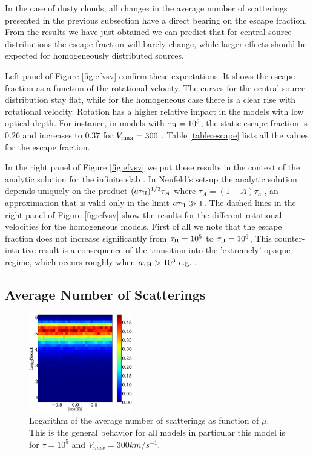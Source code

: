 \documentclass{emulateapj}
\newcommand{\kms}{{\ifmmode{{\mathrm{\,km\ s}^{-1}}}\else{\,km~s$^{-1}$}\fi}}
\begin{document}
In the case of dusty clouds, all changes in the average number
of scatterings presented in the previous subsection have a direct
bearing on the escape fraction. From the results we have just obtained
we can predict that for central source distributions the escape
fraction will barely change, while larger effects should be expected
for homogeneously distributed sources. 

Left panel of Figure \ref{fig:efvsv} confirm these expectations. It shows the escape
fraction as a function of the rotational velocity. The curves for the
central source distribution stay flat, while for the homogeneous case
there is a clear rise with rotational velocity.  Rotation has a higher relative impact in
the models with low optical depth. For instance, in models with
$\tau_{\rm H}=10^5$, the static escape fraction is $0.26$ and increases
to $0.37$ for $V_{\rm max}=300$ \kms. Table \ref{table:escape} lists
all the values for the escape fraction. 

In the right panel of Figure \ref{fig:efvsv} we put these results in the context of
the analytic solution for the infinite slab \citep{Neufeld90}. In
Neufeld's set-up the analytic solution depends uniquely on the product
$(a\tau_{\rm   H})^{1/3}\tau_{A}$ where $\tau_{A} = (1 - A)\tau_{a}$ , an approximation 
that is valid only in the limit $a\tau_{\rm   H}\gg 1$. The dashed lines in
 the right panel of Figure \ref{fig:efvsv} show the results for the different rotational
velocities for the homogeneous models. First of all we note that the escape fraction does not
increase significantly from $\tau_{\rm H}=10^{5}$ to $\tau_{\rm H}=10^{6}$, This
 counter-intuitive result is a consequence of the transition into the 'extremely' opaque regime,
  which occurs roughly when $a\tau_{\rm{H}} > 10^{3}$
  e.g. \citep{Neufeld90}.


\subsection{Average Number of Scatterings}
\label{sec:scatterings}

\begin{figure}
\begin{center}
    \includegraphics[width=0.40\textwidth]{nscattvsmu.eps}
\end{center}
\caption{Logarithm of the average number of scatterings as function of
  $\mu$. This is the general behavior for all models in particular this model
  is for $\tau=10^{5}$ and $V_{max}=300 km/s^{-1}$. \label{fig:Nscattvsmu}}    
\end{figure}
\end{document}
